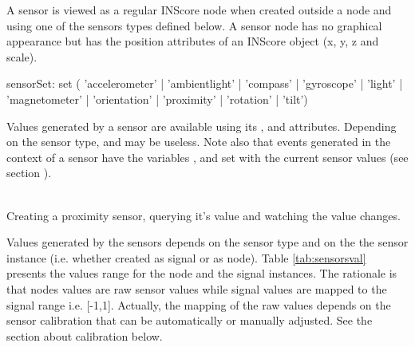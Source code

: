 A sensor is viewed as a regular INScore node when created outside a  node and using one of the sensors types defined below. A sensor node has no graphical appearance but has the position attributes of an INScore object (x, y, z and scale). 

\begin{rail}
sensorSet: 	 set (
		  'accelerometer'
		| 'ambientlight'
		| 'compass'	
		| 'gyroscope'
		| 'light'	
		| 'magnetometer'
		| 'orientation'
		| 'proximity'
		| 'rotation'
		| 'tilt')
\end{rail}

Values generated by a sensor are available using its ,  and  attributes. Depending on the sensor type,  and  may be useless. Note also that events generated in the context of a sensor have the variables ,  and  set with the current sensor values (see section ). 

\example \\
Creating a proximity sensor, querying it's value and watching the value changes.


\label{sensorValues}

Values generated by the sensors depends on the sensor type and on the the sensor instance (i.e. whether created as signal or as node). Table \ref{tab:sensorsval} presents the values range for the node and the signal instances.
The rationale is that nodes values are raw sensor values while signal values are mapped to the signal range i.e. [-1,1]. 
Actually, the mapping of the raw values depends on the sensor calibration that can be automatically or manually adjusted. See the section about calibration below.

